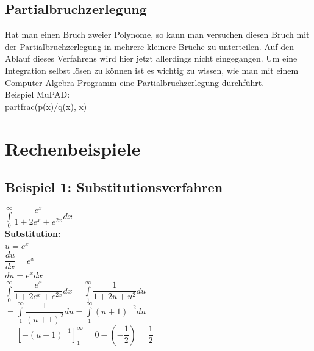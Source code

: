 \documentclass[11pt,final]{scrreprt}
\newcommand{\br} {\medskip\\}
\begin{document}
\subsection{Partialbruchzerlegung}
Hat man einen Bruch zweier Polynome, so kann man versuchen diesen Bruch mit der Partialbruchzerlegung in mehrere kleinere Brüche zu unterteilen. Auf den Ablauf dieses Verfahrens wird hier jetzt allerdings nicht eingegangen. Um eine Integration selbst lösen zu können ist es wichtig zu wissen, wie man mit einem Computer-Algebra-Programm eine Partialbruchzerlegung durchführt.\br
Beispiel MuPAD:\\
partfrac(p(x)/q(x), x)
\newpage
\section{Rechenbeispiele}
\subsection*{Beispiel 1: Substitutionsverfahren}
\hspace*{2em}$ \int\limits_0^\infty \dfrac{e^x}{1+2e^x+e^{2x}} dx$\br
\hspace*{2em}\textbf{Substitution:}\\
\hspace*{4em}$u=e^x$\\
\hspace*{4em}$\dfrac{du}{dx} = e^x$\\
\hspace*{4em}$du = e^x dx$\br
\hspace*{2em}$ \int\limits_0^\infty \dfrac{e^x}{1+2e^x+e^{2x}} dx = \int\limits_1^\infty \dfrac{1}{1+2u+u^2} du $\\
\hspace*{4em}$= \int\limits_1^\infty \dfrac{1}{(u+1)^2} du =\int \limits_1^\infty (u+1)^{-2} du  $\\
\hspace*{4em}$=[-(u+1)^{-1}]_1^\infty = 0 -(-\dfrac{1}{2}) = \dfrac{1}{2}$
\end{document}

